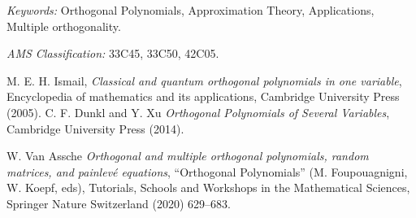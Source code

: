 \documentclass[11pt,a4paper]{amsart}
\begin{document}


\bigskip
\bigskip


\noindent
\textit{Keywords:} Orthogonal Polynomials, Approximation Theory, Applications, Multiple orthogonality.


\noindent
\textit{AMS Classification:}  33C45, 33C50, 42C05.








\begin{thebibliography}{99}

     M. E. H. Ismail,
     \emph{Classical and quantum orthogonal polynomials in one variable}, Encyclopedia of mathematics and its applications, Cambridge University Press (2005). 
     C. F. Dunkl and Y. Xu
     \emph{Orthogonal Polynomials of Several Variables}, Cambridge University Press (2014).


     W. Van Assche
     \emph{Orthogonal and multiple orthogonal polynomials, random matrices, and painlevé equations}, ``Orthogonal Polynomials'' (M. Foupouagnigni, W. Koepf, eds), Tutorials, Schools and Workshops in the Mathematical Sciences, Springer Nature Switzerland (2020) 629--683.
     
\end{thebibliography}
\end{document}
